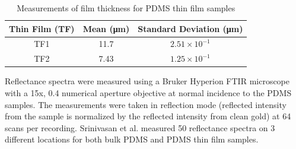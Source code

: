 \begin{table}
	\caption{\label{tab:Filmthick} Measurements of film thickness for PDMS thin film samples}
	\begin{center}
		\begin{tabular}{ccc}
			\hline 
			\hline
			\multicolumn{1}{c}{Thin Film (TF)} & \multicolumn{1}{c}{Mean (\si{\micro\meter})} & \multicolumn{1}{c}{Standard Deviation (\si{\micro\meter})} \\
			\hline 
			
			TF1 &     11.7   & $2.51\times 10^{-1}$ \\ 
			TF2 &     7.43   & $1.25\times 10^{-1}$ \\ 
			
			\hline
			\hline
		\end{tabular} 
	\end{center}
\end{table}

Reflectance spectra were measured using a Bruker Hyperion FTIR microscope with a 15x, 0.4 numerical aperture objective at normal incidence to the PDMS samples. The measurements were taken in reflection mode (reflected intensity from the sample is  normalized by the reflected intensity from clean gold) at 64 scans per recording. Srinivasan et al. measured 50 reflectance spectra on 3 different locations for both bulk PDMS and PDMS thin film samples.

